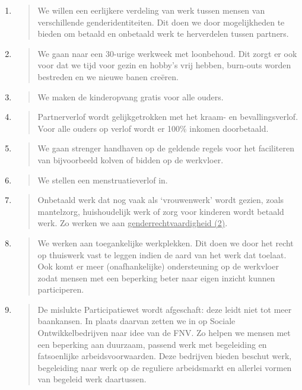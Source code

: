 \begin{enumerate}
\def\labelenumi{\arabic{enumi}.}
\item
  \begin{quote}
  We willen een eerlijkere verdeling van werk tussen mensen van
  verschillende genderidentiteiten. Dit doen we door mogelijkheden te
  bieden om betaald en onbetaald werk te herverdelen tussen partners.
  \end{quote}
\item
  \begin{quote}
  We gaan naar een 30-urige werkweek met loonbehoud. Dit zorgt er ook
  voor dat we tijd voor gezin en hobby's vrij hebben, burn-outs worden
  bestreden en we nieuwe banen creëren.
  \end{quote}
\item
  \begin{quote}
  We maken de kinderopvang gratis voor alle ouders.
  \end{quote}
\item
  \begin{quote}
  Partnerverlof wordt gelijkgetrokken met het kraam- en
  bevallingsverlof. Voor alle ouders op verlof wordt er 100\% inkomen
  doorbetaald.
  \end{quote}
\item
  \begin{quote}
  We gaan strenger handhaven op de geldende regels voor het faciliteren
  van bijvoorbeeld kolven of bidden op de werkvloer.
  \end{quote}
\item
  \begin{quote}
  We stellen een menstruatieverlof in.
  \end{quote}
\item
  \begin{quote}
  Onbetaald werk dat nog vaak als `vrouwenwerk' wordt gezien, zoals
  mantelzorg, huishoudelijk werk of zorg voor kinderen wordt betaald
  werk. Zo werken we aan \underline{genderrechtvaardigheid (2)}.
  \end{quote}
\item
  \begin{quote}
  We werken aan toegankelijke werkplekken. Dit doen we door het recht op
  thuiswerk vast te leggen indien de aard van het werk dat toelaat. Ook
  komt er meer (onafhankelijke) ondersteuning op de werkvloer zodat
  mensen met een beperking beter naar eigen inzicht kunnen participeren.
  \end{quote}
\item
  \begin{quote}
  De mislukte Participatiewet wordt afgeschaft: deze leidt niet tot meer
  baankansen. In plaats daarvan zetten we in op Sociale
  Ontwikkelbedrijven naar idee van de FNV. Zo helpen we mensen met een
  beperking aan duurzaam, passend werk met begeleiding en fatsoenlijke
  arbeidsvoorwaarden. Deze bedrijven bieden beschut werk, begeleiding
  naar werk op de reguliere arbeidsmarkt en allerlei vormen van begeleid
  werk daartussen.
  \end{quote}
\end{enumerate}

